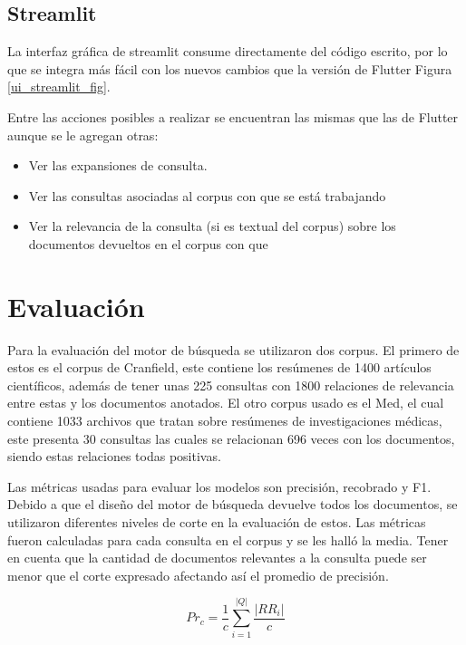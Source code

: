\documentclass[runningheads]{llncs}
\begin{document}
\subsection{Streamlit}

La interfaz gráfica de streamlit consume directamente del código escrito, por lo que se 
integra más fácil con los nuevos cambios que la versión de Flutter Figura \ref{ui_streamlit_fig}.

Entre las acciones posibles a realizar se encuentran las mismas que las de Flutter aunque se le
agregan otras:

\begin{itemize}

\item Ver las expansiones de consulta.
\item Ver las consultas asociadas al corpus con que se está trabajando
\item Ver la relevancia de la consulta (si es textual del corpus) sobre los 
documentos devueltos en el corpus con que

\end{itemize}

\section{Evaluación}

Para la evaluación del motor de búsqueda se utilizaron dos corpus. El primero de estos
es el corpus de Cranfield, este contiene los resúmenes de 1400 artículos científicos, además
de tener unas 225 consultas con 1800 relaciones de relevancia entre estas y los documentos anotados.
El otro corpus usado es el Med, el cual contiene 1033 archivos que tratan sobre resúmenes de investigaciones
médicas, este presenta 30 consultas las cuales se relacionan 696 veces con los documentos, siendo estas
relaciones todas positivas.

Las métricas usadas para evaluar los modelos son precisión, recobrado y F1. Debido a que el diseño del
motor de búsqueda devuelve todos los documentos, se utilizaron diferentes niveles de corte en la evaluación
de estos. Las métricas fueron calculadas para cada consulta en el corpus y se les halló la media. Tener en cuenta
que la cantidad de documentos relevantes a la consulta puede ser menor que el corte expresado afectando así el
promedio de precisión.

\begin{equation}
Pr_c = \frac{1}{c} \sum_{i=1}^{|Q|} \frac{|RR_i|}{c}
\end{equation}
\end{document}
